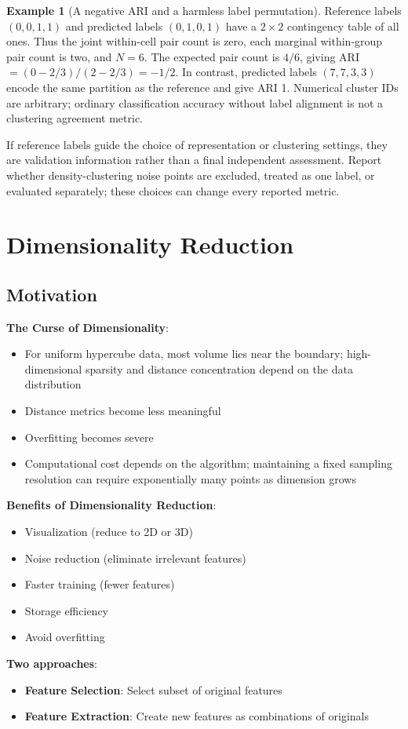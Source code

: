 \documentclass[11pt,twoside]{article}
\numberwithin{equation}{section}
\theoremstyle{plain}
\theoremstyle{definition}
\newtheorem{example}[theorem]{Example}
\theoremstyle{remark}
\newenvironment{keyidea}{
  \begin{tcolorbox}[colback=yellow!5!white,
                    colframe=yellow!50!black,
                    title=Key Idea,
                    breakable,
                    enhanced,
                    sharp corners,
                    boxrule=0.8pt,
                    left=6pt, right=6pt, top=6pt, bottom=6pt]
}{
  \end{tcolorbox}
}
\begin{document}
\begin{example}[A negative ARI and a harmless label permutation]
Reference labels $(0,0,1,1)$ and predicted labels $(0,1,0,1)$ have a $2\times2$ contingency table of all ones. Thus the joint within-cell pair count is zero, each marginal within-group pair count is two, and $N=6$. The expected pair count is $4/6$, giving ARI $=(0-2/3)/(2-2/3)=-1/2$. In contrast, predicted labels $(7,7,3,3)$ encode the same partition as the reference and give ARI 1. Numerical cluster IDs are arbitrary; ordinary classification accuracy without label alignment is not a clustering agreement metric.
\end{example}
If reference labels guide the choice of representation or clustering settings, they are validation information rather than a final independent assessment. Report whether density-clustering noise points are excluded, treated as one label, or evaluated separately; these choices can change every reported metric.

\section{Dimensionality Reduction}
\label{sec:dim-reduction}

\subsection{Motivation}

\begin{keyidea}
\textbf{The Curse of Dimensionality}:
\begin{itemize}
\item For uniform hypercube data, most volume lies near the boundary; high-dimensional sparsity and distance concentration depend on the data distribution
\item Distance metrics become less meaningful
\item Overfitting becomes severe
\item Computational cost depends on the algorithm; maintaining a fixed sampling resolution can require exponentially many points as dimension grows
\end{itemize}

\textbf{Benefits of Dimensionality Reduction}:
\begin{itemize}
\item Visualization (reduce to 2D or 3D)
\item Noise reduction (eliminate irrelevant features)
\item Faster training (fewer features)
\item Storage efficiency
\item Avoid overfitting
\end{itemize}

\textbf{Two approaches}:
\begin{itemize}
\item \textbf{Feature Selection}: Select subset of original features
\item \textbf{Feature Extraction}: Create new features as combinations of originals
\end{itemize}
\end{keyidea}
\end{document}
